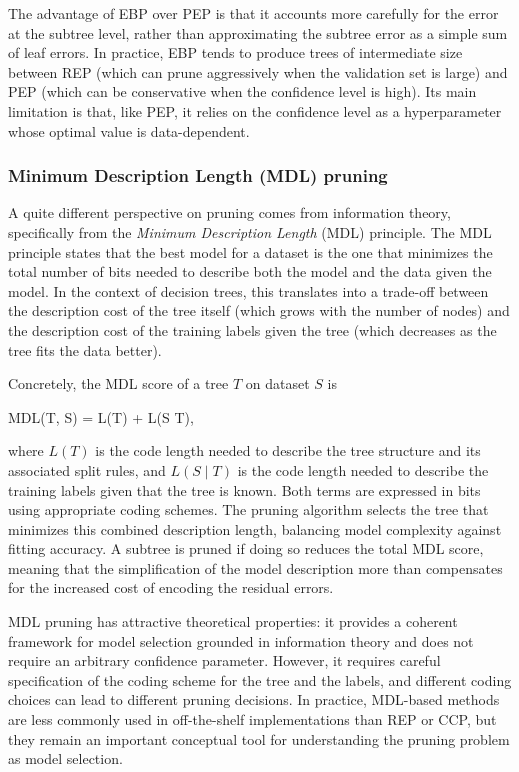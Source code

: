 The advantage of EBP over PEP is that it accounts more carefully for the error at the
subtree level, rather than approximating the subtree error as a simple sum of leaf errors.
In practice, EBP tends to produce trees of intermediate size between REP (which can prune
aggressively when the validation set is large) and PEP (which can be conservative when the
confidence level is high). Its main limitation is that, like PEP, it relies on the
confidence level as a hyperparameter whose optimal value is data-dependent.

\subsubsection*{Minimum Description Length (MDL) pruning}

A quite different perspective on pruning comes from information theory, specifically from
the \emph{Minimum Description Length} (MDL) principle. The MDL principle states that the
best model for a dataset is the one that minimizes the total number of bits needed to
describe both the model and the data given the model. In the context of decision trees, this
translates into a trade-off between the description cost of the tree itself (which grows
with the number of nodes) and the description cost of the training labels given the tree
(which decreases as the tree fits the data better).

Concretely, the MDL score of a tree $T$ on dataset $S$ is
\begin{myequation}
MDL(T, S) = L(T) + L(S \mid T),
\end{myequation}
where $L(T)$ is the code length needed to describe the tree structure and its associated
split rules, and $L(S \mid T)$ is the code length needed to describe the training labels
given that the tree is known. Both terms are expressed in bits using appropriate coding
schemes. The pruning algorithm selects the tree that minimizes this combined description
length, balancing model complexity against fitting accuracy. A subtree is pruned if doing
so reduces the total MDL score, meaning that the simplification of the model description
more than compensates for the increased cost of encoding the residual errors.

MDL pruning has attractive theoretical properties: it provides a coherent framework for
model selection grounded in information theory and does not require an arbitrary confidence
parameter. However, it requires careful specification of the coding scheme for the tree and
the labels, and different coding choices can lead to different pruning decisions. In
practice, MDL-based methods are less commonly used in off-the-shelf implementations than
REP or CCP, but they remain an important conceptual tool for understanding the pruning
problem as model selection.


